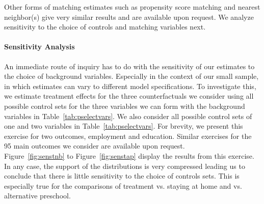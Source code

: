 \noindent Other forms of matching estimates such as propensity score matching and nearest neighbor(s) give very similar results and are available upon request. We analyze sensitivity to the choice of controls and matching variables next.\\

\paragraph{Sensitivity Analysis} \label{app:senscontrols}

\noindent An immediate route of inquiry has to do with the sensitivity of our estimates to the choice of background variables. Especially in the context of our small sample, in which estimates can vary to different model specifications. To investigate this, we estimate treatment effects for the three counterfactuals we consider using all possible control sets for the three variables we can form with the background variables in Table~\ref{tab:pselectvars}. We also consider all possible control sets of one and two variables in Table~\ref{tab:pselectvars}. For brevity, we present this exercise for two outcomes, employment and education. Similar exercises for the 95 main outcomes we consider are available upon request.\\

\noindent Figure~\ref{fig:senstnb} to Figure~\ref{fig:senstap} display the results from this exercise. In any case, the support of the distributions is very compressed leading us to conclude that there is little sensitivity to the choice of controls sets. This is especially true for the comparisons of treatment vs. staying at home and vs. alternative preschool.

